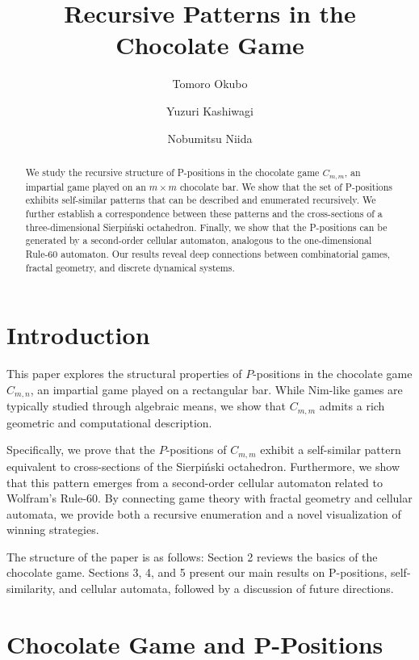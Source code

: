 \documentclass{article}
\title{Recursive Patterns in the Chocolate Game}
\author{
  Tomoro Okubo \and
  Yuzuri Kashiwagi \and
  Nobumitsu Niida
}
\date{}
\theoremstyle{definition}
\theoremstyle{plain}
\theoremstyle{remark}
\begin{document}
\maketitle

\begin{abstract}
We study the recursive structure of P-positions in the chocolate game \(C_{m,m}\), an impartial game played on an \(m \times m\) chocolate bar. We show that the set of P-positions exhibits self-similar patterns that can be described and enumerated recursively. We further establish a correspondence between these patterns and the cross-sections of a three-dimensional Sierpiński octahedron. Finally, we show that the P-positions can be generated by a second-order cellular automaton, analogous to the one-dimensional Rule-60 automaton. Our results reveal deep connections between combinatorial games, fractal geometry, and discrete dynamical systems.
\end{abstract}

\section{Introduction}
This paper explores the structural properties of $P$-positions in the chocolate game $C_{m,n}$, an impartial game played on a rectangular bar. While Nim-like games are typically studied through algebraic means, we show that $C_{m,m}$ admits a rich geometric and computational description.

Specifically, we prove that the $P$-positions of $C_{m,m}$ exhibit a self-similar pattern equivalent to cross-sections of the Sierpi\'nski octahedron. Furthermore, we show that this pattern emerges from a second-order cellular automaton related to Wolfram’s Rule-60. By connecting game theory with fractal geometry and cellular automata, we provide both a recursive enumeration and a novel visualization of winning strategies. 

The structure of the paper is as follows: Section 2 reviews the basics of the chocolate game. 
Sections 3, 4, and 5 present our main results on P-positions, self-similarity, and cellular automata, 
followed by a discussion of future directions.



\section{Chocolate Game and P-Positions}
\end{document}
